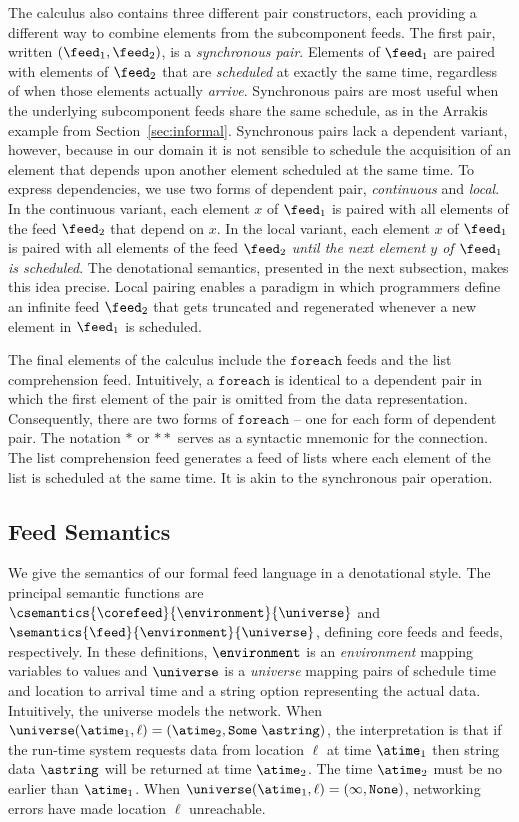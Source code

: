 The calculus also contains three different
pair constructors, each providing a different way to
combine elements from the subcomponent feeds.  The first pair, 
written $(\feed_1, \feed_2)$, is a {\em synchronous pair}.
Elements of $\feed_1$ are paired with elements of $\feed_2$
that are {\em scheduled} at exactly the same time, regardless of when those elements
actually {\em arrive}.  Synchronous pairs are most useful when the underlying
subcomponent feeds share the same schedule, as in the Arrakis example
from Section~\ref{sec:informal}.  Synchronous pairs lack a
dependent variant, however, because in our domain it is not sensible
to schedule the acquisition of an element that depends upon another
element scheduled at the same time.  To express dependencies, we 
use two forms of dependent pair, {\em continuous} and {\em local}.
In the continuous variant, each element $x$ of $\feed_1$ is paired 
with all elements of the feed $\feed_2$ that depend on $x$.  In the
local variant, each element $x$ of $\feed_1$
is paired with all elements of the feed $\feed_2$ {\em until the next
element $y$ of $\feed_1$ is scheduled}.  
The denotational semantics, presented
in the next subsection, makes this idea precise.  Local pairing
enables a paradigm in which programmers define an infinite feed $\feed_2$
that gets truncated and regenerated whenever a new element in $\feed_1$
is scheduled.


The final elements of the calculus include the $\mathtt{foreach}$ feeds
and the list comprehension feed.
Intuitively, a $\mathtt{foreach}$ is identical to a dependent pair in
which the first element of the pair is omitted from the data representation.
Consequently, there are two forms of $\mathtt{foreach}$ -- one for
each form of dependent pair.  The notation ${*}$ or ${**}$ serves as
a syntactic mnemonic for the connection.  The list comprehension
feed generates a feed of lists where each element of the list is
scheduled at the same time.  It is akin to the synchronous pair
operation. 


%



\subsection{Feed Semantics}
We give the semantics of our formal feed language in 
a denotational style.  The principal semantic functions are
$\csemantics{\corefeed}{\environment}{\universe}$ and
$\semantics{\feed}{\environment}{\universe}$, defining core feeds and
feeds, respectively.  In these definitions,
$\environment$ is an {\em environment} mapping variables to values
and $\universe$ is a {\em universe} mapping pairs of
schedule time and location to arrival time and a string option
representing the actual data.
Intuitively, the universe models the network.
When $\universe (\atime_1, \ell) = (\atime_2, \mathtt{Some} \; \astring)$,
 the interpretation is that if the run-time system requests data
from location $\ell$ at time $\atime_1$ then string data $\astring$
will be returned at time $\atime_2$.  The time $\atime_2$ must be
no earlier than $\atime_1$.
When $\universe (\atime_1, \ell) = (\infty, \mathtt{None})$,
networking errors have made location $\ell$ unreachable.

